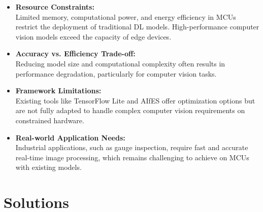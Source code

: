     \begin{itemize}
        \item \textbf{Resource Constraints:} \\
        Limited memory, computational power, and energy efficiency in MCUs restrict the deployment of traditional DL models. High-performance computer vision models exceed the capacity of edge devices.\cite{Ard:2021}
        
        \item \textbf{Accuracy vs. Efficiency Trade-off:} \\
        Reducing model size and computational complexity often results in performance degradation, particularly for computer vision tasks.\cite{shi:2016}
        
        \item \textbf{Framework Limitations:} \\
        Existing tools like TensorFlow Lite and AIfES offer optimization options but are not fully adapted to handle complex computer vision requirements on constrained hardware.\cite{Kristian:2020}
        
        \item \textbf{Real-world Application Needs:} \\
        Industrial applications, such as gauge inspection, require fast and accurate real-time image processing, which remains challenging to achieve on MCUs with existing models.\cite{Kristian:2020}
    \end{itemize}
    
    \section{Solutions}
    
